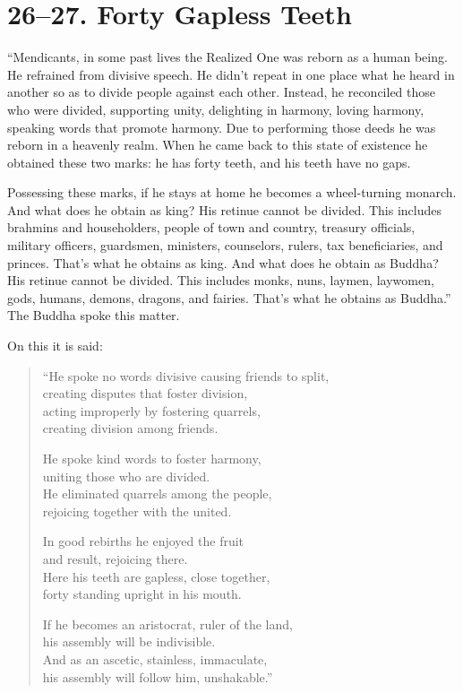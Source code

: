 \documentclass[12pt,openany]{book}%
\begin{document}
\section*{26–27. Forty Gapless Teeth }

“Mendicants, in some past lives the Realized One was reborn as a human being. He refrained from divisive speech. He didn’t repeat in one place what he heard in another so as to divide people against each other. Instead, he reconciled those who were divided, supporting unity, delighting in harmony, loving harmony, speaking words that promote harmony. Due to performing those deeds he was reborn in a heavenly realm. When he came back to this state of existence he obtained these two marks: he has forty teeth, and his teeth have no gaps. 

Possessing these marks, if he stays at home he becomes a wheel-turning monarch. And what does he obtain as king? His retinue cannot be divided. This includes brahmins and householders, people of town and country, treasury officials, military officers, guardsmen, ministers, counselors, rulers, tax beneficiaries, and princes. That’s what he obtains as king. And what does he obtain as Buddha? His retinue cannot be divided. This includes monks, nuns, laymen, laywomen, gods, humans, demons, dragons, and fairies. That’s what he obtains as Buddha.” The Buddha spoke this matter. 

On this it is said: 

\begin{verse}%
“He spoke no words divisive causing friends to split, \\
creating disputes that foster division, \\
acting improperly by fostering quarrels, \\
creating division among friends. 

He spoke kind words to foster harmony, \\
uniting those who are divided. \\
He eliminated quarrels among the people, \\
rejoicing together with the united. 

In good rebirths he enjoyed the fruit \\
and result, rejoicing there. \\
Here his teeth are gapless, close together, \\
forty standing upright in his mouth. 

If he becomes an aristocrat, ruler of the land, \\
his assembly will be indivisible. \\
And as an ascetic, stainless, immaculate, \\
his assembly will follow him, unshakable.” 

%
\end{verse}
\end{document}
